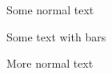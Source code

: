 \documentclass{article}
\begin{document}
Some normal text
\begin{vertbar}
Some text with bars
\end{vertbar}
More normal text
\end{document}
